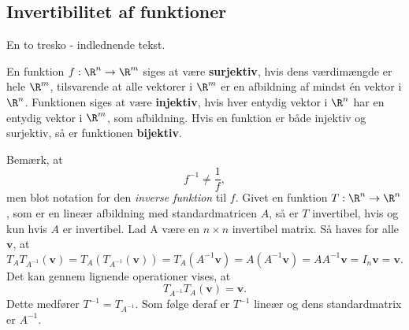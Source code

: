 %
%
\subsection{Invertibilitet af funktioner}
%
En to tresko - indlednende tekst.
%
\begin{defn}{}{}
En funktion $f:\R^n \rightarrow \R^m$ siges at være \textbf{surjektiv}, hvis dens værdimængde er hele $\R^m$, tilsvarende at alle vektorer i $\R^m$ er en afbildning af mindst én vektor i $\R^n$.
Funktionen siges at være \textbf{injektiv}, hvis hver entydig vektor i $\R^n$ har en entydig vektor i $\R^m$, som afbildning.
Hvis en funktion er både injektiv og surjektiv, så er funktionen \textbf{bijektiv}.
\end{defn}
\noindent
%
Bemærk, at
$$f^{-1} \neq \frac{1}{f},$$
men blot notation for den \textit{inverse funktion} til $f$.
Givet en funktion $T:\R^n \rightarrow \R^n$, som er en lineær afbildning med standardmatricen $A$, så er $T$ invertibel, hvis og kun hvis $A$ er invertibel. 
Lad A være en $n \times n$ invertibel matrix. 
Så haves for alle $\textbf{v}$, at
$$T_AT_{A^{-1}}(\textbf{v})=T_A(T_{A^{-1}}(\textbf{v}))=T_A(A^{-1}\textbf{v})=A(A^{-1}\textbf{v})=AA^{-1}\textbf{v}=I_n\textbf{v}=\textbf{v}.$$
Det kan gennem lignende operationer vises, at
$$T_{A^{-1}}T_A(\textbf{v})=\textbf{v}.$$
%
Dette medfører $T^{-1}=T_{A^{-1}}$. 
Som følge deraf er $T^{-1}$ lineær og dens standardmatrix er $A^{-1}$.
\\
%
